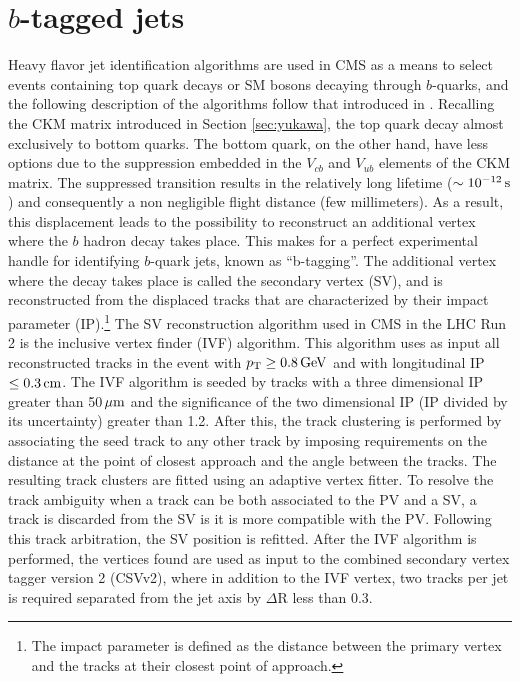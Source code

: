 \section{$b$-tagged jets}\label{sec:objectsBJets}
\noindent\justify
Heavy flavor jet identification algorithms are used in CMS as a means to select events containing top quark decays or SM bosons decaying through $b$-quarks, and the following description of the algorithms follow that introduced in \cite{Sirunyan:2017ezt}. 
Recalling the CKM matrix introduced in Section \ref{sec:yukawa}, the top quark decay almost exclusively to bottom quarks. 
The bottom quark, on the other hand, have less options due to the suppression embedded in the $V_{cb}$ and $V_{ub}$ elements of the CKM matrix. 
The suppressed transition results in the relatively long lifetime ($\sim10^{-12}\,\text{s}$) and consequently a non negligible flight distance (few millimeters). 
As a result, this displacement leads to the possibility to reconstruct an additional vertex where the $b$ hadron decay takes place. 
This makes for a perfect experimental handle for identifying $b$-quark jets, known as ``b-tagging''. 
The additional vertex where the decay takes place is called the secondary vertex (SV), and is reconstructed from the displaced tracks that are characterized by their impact parameter (IP).\footnote{The impact parameter is defined as the distance between the primary vertex and the tracks at their closest point of approach.}
The SV reconstruction algorithm used in CMS in the LHC Run 2 is the inclusive vertex finder (IVF) algorithm.
This algorithm uses as input all reconstructed tracks in the event with $p_{\mathrm{T}}\geq0.8\,\text{Ge\hspace{-.08em}V}$ and with longitudinal IP $\leq0.3\,\text{cm}$. 
The IVF algorithm is seeded by tracks with a three dimensional IP greater than 50$\,\mu\text{m}$ and the significance of the two dimensional IP (IP divided by its uncertainty) greater than 1.2. 
After this, the track clustering is performed by associating the seed track to any other track by imposing requirements on the distance at the point of closest approach and the angle between the tracks. 
The resulting track clusters are fitted using an adaptive vertex fitter. 
To resolve the track ambiguity when a track can be both associated to the PV and a SV, a track is discarded from the SV is it is more compatible with the PV. 
Following this track arbitration, the SV position is refitted. 
After the IVF algorithm is performed, the vertices found are used as input to the combined secondary vertex tagger version 2 (CSVv2), where in addition to the IVF vertex, two tracks per jet is required separated from the jet axis by $\Delta$R less than 0.3. 
